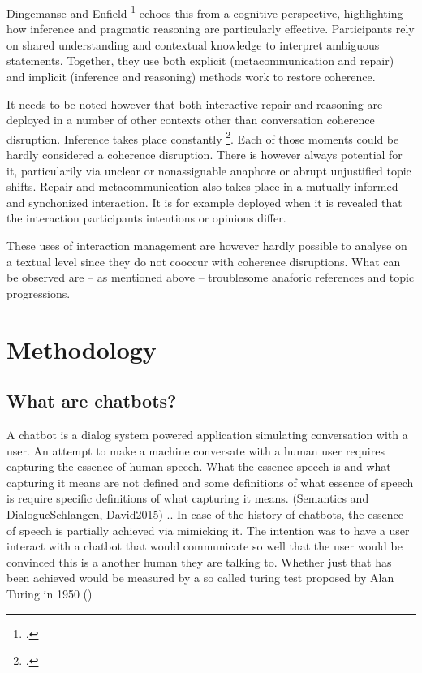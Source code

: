 \documentclass[12pt]{report}
\begin{document}
{\par
Dingemanse and Enfield \footcite{DINGEMANSE202430} echoes this from a cognitive perspective,
highlighting how inference and pragmatic reasoning are particularly effective.
Participants rely on shared understanding and contextual knowledge to interpret ambiguous statements.
Together, they use both
explicit (metacommunication and repair) and
implicit (inference and reasoning)
methods work to restore coherence.

\par
It needs to be noted however that both interactive repair and reasoning are
deployed in a number of other contexts
other than conversation coherence disruption.
Inference takes place constantly \footcite{garfinkelstudies}.
Each of those moments could be hardly considered a coherence disruption.
There is however always potential for it,
particularily via unclear or nonassignable anaphore or abrupt unjustified topic shifts.
Repair and metacommunication also takes place in a mutually informed and synchonized interaction.
It is for example deployed when it is revealed
that the interaction participants intentions or opinions differ.

\par
These uses of interaction management are however
hardly possible to analyse on a textual level
since they do not cooccur with coherence disruptions.
What can be observed are – as mentioned above –
troublesome anaforic references and topic progressions.

\chapter{Methodology}

\section{What are chatbots?}
\par
A chatbot is a dialog system powered application simulating conversation with a user.
An attempt to make a machine conversate with a human user requires capturing the essence of human speech.
What the essence speech is and what capturing it means are not defined and
some definitions of what essence of speech is
require specific definitions of what capturing it means.
(Semantics and DialogueSchlangen, David2015) ..
In case of the history of chatbots,
the essence of speech is partially achieved
via mimicking it.
The intention was to have a user interact with a chatbot
that would communicate so well that
the user would be convinced
this is a another human they are talking to.
Whether just that has been achieved would be measured by a so called turing test
proposed by Alan Turing in 1950 ()

}
\end{document}
